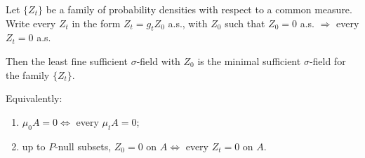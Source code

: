 Let $\{Z_t\}$ be a family of probability densities with respect to a common measure. Write every $Z_t$ in the form $Z_t = g_t Z_0$ a.s., with $Z_0$ such that $Z_0 = 0$ a.s. $\Rightarrow$ every $Z_t = 0$ a.s.

Then the least fine sufficient $\sigma$-field with $Z_0$ is the minimal sufficient $\sigma$-field for the family $\{Z_t\}$.

Equivalently:
\begin{enumerate}
\item[(i)] $\mu_0 A = 0 \iff$ every $\mu_t A = 0$;
\item[(i')] up to $P$-null subsets, $Z_0 = 0$ on $A \iff$ every $Z_t = 0$ on $A$.
\end{enumerate}

